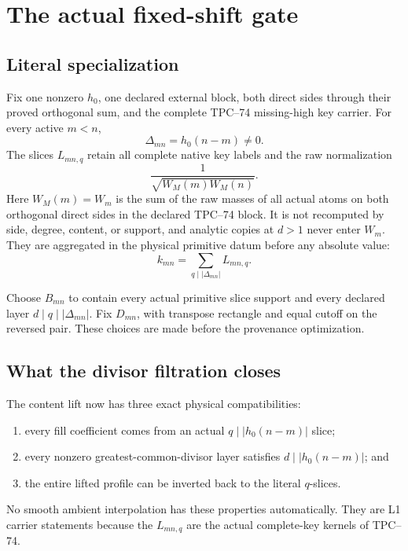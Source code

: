 \section{The actual fixed-shift gate}
\label{sec:physical-gate}

\subsection{Literal specialization}

Fix one nonzero \(h_0\), one declared external block, both direct sides
through their proved orthogonal sum, and the complete TPC--74
missing-high key carrier.  For every active \(m<n\),
\[
 \Delta_{mn}=h_0(n-m)\ne0.
\]
The slices \(L_{mn,q}\) retain all complete native key labels and the raw
normalization
\[
 \frac1{\sqrt{W_M(m)W_M(n)}}.
\]
Here \(W_M(m)=W_m\) is the sum of the raw masses of all actual atoms on
both orthogonal direct sides in the declared TPC--74 block.  It is not
recomputed by side, degree, content, or support, and analytic copies at
\(d>1\) never enter \(W_m\).
They are aggregated in the physical primitive datum before any absolute
value:
\[
 k_{mn}=\sum_{q\mid|\Delta_{mn}|}L_{mn,q}.
\]

Choose \(B_{mn}\) to contain every actual primitive slice support and
every declared layer \(d\mid q\mid|\Delta_{mn}|\).  Fix \(D_{mn}\), with
transpose rectangle and equal cutoff on the reversed pair.  These choices
are made before the provenance optimization.

\subsection{What the divisor filtration closes}

The content lift now has three exact physical compatibilities:
\begin{enumerate}[label=\textup{(\roman*)},leftmargin=2.7em]
 \item every fill coefficient comes from an actual
       \(q\mid|h_0(n-m)|\) slice;
 \item every nonzero greatest-common-divisor layer satisfies
       \(d\mid|h_0(n-m)|\); and
 \item the entire lifted profile can be inverted back to the literal
       \(q\)-slices.
\end{enumerate}
No smooth ambient interpolation has these properties automatically.
They are L1 carrier statements because the \(L_{mn,q}\) are the actual
complete-key kernels of TPC--74.

